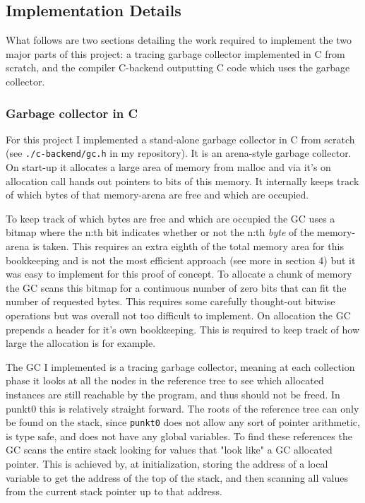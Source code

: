 \subsection{Implementation Details}
What follows are two sections detailing the work required to implement the two major parts of this project: a tracing garbage collector implemented in C from scratch, and the compiler C-backend outputting C code which uses the garbage collector.

\subsubsection{Garbage collector in C}
For this project I implemented a stand-alone garbage collector in C from scratch (see \texttt{./c-backend/gc.h} in my repository). It is an arena-style garbage collector. On start-up it allocates a large area of memory from malloc and via it's on allocation call hands out pointers to bits of this memory. It internally keeps track of which bytes of that memory-arena are free and which are occupied.

To keep track of which bytes are free and which are occupied the GC uses a bitmap where the n:th bit indicates whether or not the n:th \textit{byte} of the memory-arena is taken. This requires an extra eighth of the total memory area for this bookkeeping and is not the most efficient approach (see more in section 4) but it was easy to implement for this proof of concept. To allocate a chunk of memory the GC scans this bitmap for a continuous number of zero bits that can fit the number of requested bytes. This requires some carefully thought-out bitwise operations but was overall not too difficult to implement. On allocation the GC prepends a header for it's own bookkeeping. This is required to keep track of how large the allocation is for example.

The GC I implemented is a tracing garbage collector, meaning at each collection phase it looks at all the nodes in the reference tree to see which allocated instances are still reachable by the program, and thus should not be freed. In punkt0 this is relatively straight forward. The roots of the reference tree can only be found on the stack, since \texttt{punkt0} does not allow any sort of pointer arithmetic, is type safe, and does not have any global variables. To find these references the GC scans the entire stack looking for values that "look like" a GC allocated pointer. This is achieved by, at initialization, storing the address of a local variable to get the address of the top of the stack, and then scanning all values from the current stack pointer up to that address.

